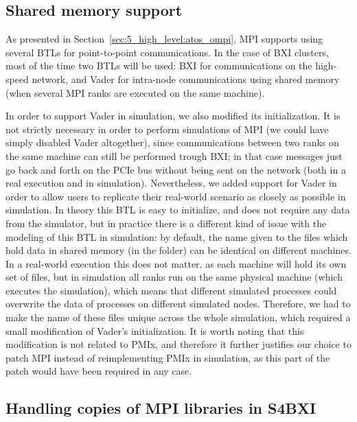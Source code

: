 \subsection{Shared memory support}
\label{sec:5_high_level:shared_mem_support}

As presented in Section~\ref{sec:5_high_level:atos_ompi}, MPI supports using
several BTLs for point-to-point communications. In the case of BXI clusters,
most of the time two BTLs will be used: BXI for communications on the high-speed
network, and Vader for intra-node communications using shared memory (when
several MPI ranks are executed on the same machine).

In order to support Vader in simulation, we also modified its initialization. It
is not strictly necessary in order to perform simulations of MPI (we could have
simply disabled Vader altogether), since communications between two ranks on the
same machine can still be performed trough BXI: in that case messages just go
back and forth on the PCIe bus without being sent on the network (both in a real
execution and in simulation). Nevertheless, we added support for Vader in order
to allow users to replicate their real-world scenario as closely as possible in
simulation. In theory this BTL is easy to initialize, and does not require any
data from the simulator, but in practice there is a different kind of issue with
the modeling of this BTL in simulation: by default, the name given to the files
which hold data in shared memory (in the  folder) can be
identical on different machines. In a real-world execution this does not matter,
as each machine will hold its own set of files, but in simulation all ranks run
on the same physical machine (which executes the simulation), which means that
different simulated processes could overwrite the data of processes on different
simulated nodes. Therefore, we had to make the name of these files unique across
the whole simulation, which required a small modification of Vader's
initialization. It is worth noting that this modification is not related to
PMIx, and therefore it further justifies our choice to patch MPI instead of
reimplementing PMIx in simulation, as this part of the patch would have been
required in any case.

\subsection{Handling copies of MPI libraries in S4BXI}
\label{sec:5_high_level:relinkage_of_libs}

